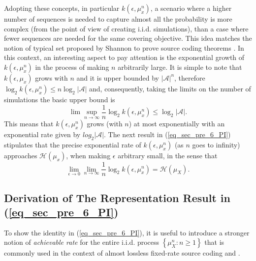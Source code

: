 Adopting these concepts, in particular $k(\epsilon, \mu^n_x)$, a scenario where a higher number of sequences is needed to capture almost all the probability is more complex (from the point of view of creating i.i.d. simulations), than a case where fewer sequences are needed for the same covering objective. {This idea matches the notion of {typical set} proposed by Shannon to prove source coding theorems \citep{shannon_1948}.}
%
In this context, an interesting aspect to pay attention is the exponential growth of $k(\epsilon, \mu^n_x)$ in the process of making $n$ arbitrarily large. %
It is simple to note that $k(\epsilon, \mu_x)$ grows with $n$ and it is upper bounded by $\left|\mathcal{A}\right|^n$, therefore $\log_2 k(\epsilon, \mu^n_x) \leq n \log_2 \left|\mathcal{A}\right|$ and, consequently,  taking the limits on the number of simulations the basic upper bound is
\begin{equation}\label{eq_sec_pre_5b_PI}
\lim\sup_{n \longrightarrow \infty} \frac{1}{n} \log_2 k(\epsilon, \mu^n_x) \leq \log_2 \left|\mathcal{A}\right|.
\end{equation}
This means that $k(\epsilon, \mu^n_x)$ grows (with $n$) at most exponentially with an exponential rate given by $log_2 \left|\mathcal{A}\right|$. The next result in (\ref{eq_sec_pre_6_PI}) stipulates that the precise exponential rate of $k(\epsilon, \mu^n_x)$  (as $n$ goes to infinity) approaches $\mathcal{H}(\mu_x)$, when making $\epsilon$ arbitrary small, in the sense that
\begin{equation}\label{eq_sec_pre_6_PI}
	\lim_{\epsilon \longrightarrow 0}\lim_{n \longrightarrow \infty} \frac{1}{n} \log_2 k(\epsilon, \mu^n_x) = \mathcal{H}(\mu_X).
\end{equation}

\subsection{Derivation of The Representation Result in (\ref{eq_sec_pre_6_PI})}
To show the identity in (\ref{eq_sec_pre_6_PI}), it is useful to introduce a stronger notion of {\em achievable rate} for the entire i.i.d. process $\left\{\mu_X^n: n\geq 1\right\}$ that is commonly used in the context of almost lossless fixed-rate source coding \citep[Chap.3]{cover_2006} and \citep[Chap.4]{yeung_2002}. 

